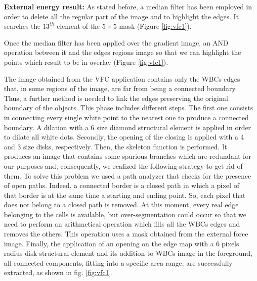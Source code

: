 \documentclass[final,a4paper,12pt,english]{UnicaPhdThesis3}
\begin{document}
{\textbf{External energy result:}  As stated before, a median filter has been employed in order to delete all the regular part of the image and to highlight the edges. It searches the $13^{th}$ element of the $5 \times 5$ mask (Figure \ref{fig:vfc1}). 

Once the median filter has been applied over the gradient image, an AND operation between it and the edges regions image so that we can highlight the points which result to be in overlay (Figure \ref{fig:vfc1}).

The image obtained from the VFC application contains only the WBCs edges that, in some regions of the image, are far from being a connected boundary. Thus, a further method is needed to link the edges preserving the original boundary of the objects. This phase includes different steps. The first one consists in connecting every single white point to the nearest one to produce a connected boundary. A dilation with a 6 size diamond structural element is applied in order to dilate all white dots. Secondly, the opening of the closing is applied with a 4 and 3 size disks, respectively. Then, the skeleton function is performed. It produces an image that contains some spurious branches which are redundant for our purposes and, consequently, we realized the following strategy to get rid of them. 
To solve this problem we used a path analyzer that checks for the presence of open paths. Indeed, a connected border is a closed path in which a pixel of that border is at the same time a starting and ending point. So, each pixel that does not belong to a closed path is removed.
At this moment, every real edge belonging to the cells is available, but over-segmentation could occur so that we need to perform an arithmetical operation which fills all the WBCs edges and removes the others. This operation uses a mask obtained from the external force image.
Finally, the application of an opening on the edge map with a 6 pixels radius disk structural element and its addition to WBCs image in the foreground, all connected components, fitting into a specific area range, are successfully extracted, as shown in fig. \ref{fig:vfc1}. 

}
\end{document}
